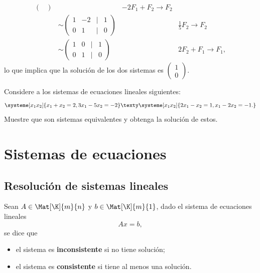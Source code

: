\documentclass[compacto,10pt]{pubciencias-notas}
\begin{document}
\begin{ejem}
\begin{align*}
\begin{pmatrix}
    \end{pmatrix}
    && -2F_{1} + F_{2} \to F_{2}\\
    &\sim \begin{pmatrix}
    1&-2&|&1\\
    0&1&|&0
    \end{pmatrix}
    && \frac{1}{5}F_{2} \to F_{2}\\
    &\sim \begin{pmatrix}
    1& 0&|&1\\
    0&  1&|&0
    \end{pmatrix}
    && 2F_{2} + F_{1} \to F_{1},
\end{align*}
lo que implica que la solución de los dos sistemas es $\begin{pmatrix}1\\0\end{pmatrix}$.
\end{ejem}

\begin{ejer}\hspace{0pt}
Considere a los sistemas de ecuaciones lineales siguientes:
\[
    \systeme[x_1 x_2]{x_1 +x_2 = 2,
        3x_1 -5x_2 = - 2}
    \texty
    \systeme[x_1 x_2]{2x_1 -x_2 = 1,
        x_1 -2x_2 = - 1.}
\]
Muestre que son sistemas equivalentes y obtenga la solución de estos.
\end{ejer}

\setcounter{section}{1}
\section{Sistemas de ecuaciones}
\setcounter{subsection}{1}
\subsection{Resolución de sistemas lineales}

\begin{defi}
    Sean $A\in \Mat[\K]{m}{n}$ y $b\in \Mat[\K]{m}{1}$, dado el sistema de ecuaciones lineales
    \[
        Ax=b,
    \]
    se dice que
    \begin{itemize}
    \item
        el sistema es \textbf{inconsistente} si no tiene solución;
    \item
        el sistema es \textbf{consistente} si tiene al menos una solución.
    \end{itemize}
\end{defi}
\end{document}
